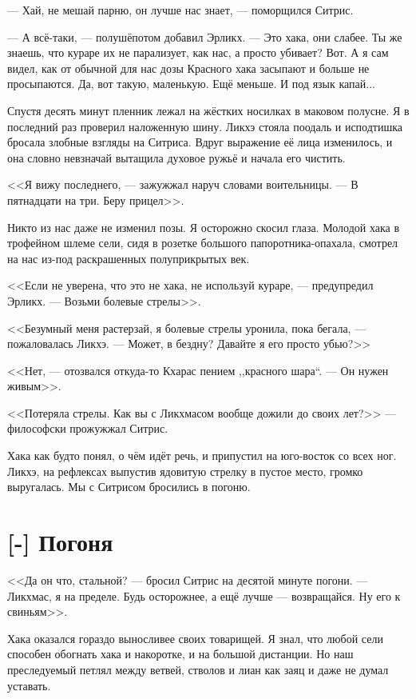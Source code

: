 --- Хай, не мешай парню, он лучше нас знает, --- поморщился Ситрис.

--- А всё-таки, --- полушёпотом добавил Эрликх.
--- Это хака, они слабее.
Ты же знаешь, что кураре их не парализует, как нас, а просто убивает?
Вот.
А я сам видел, как от обычной для нас дозы Красного хака засыпают и больше не просыпаются.
Да, вот такую, маленькую.
Ещё меньше.
И под язык капай...

Спустя десять минут пленник лежал на жёстких носилках в маковом полусне.
Я в последний раз проверил наложенную шину.
Ликхэ стояла поодаль и исподтишка бросала злобные взгляды на Ситриса.
Вдруг выражение её лица изменилось, и она словно невзначай вытащила духовое ружьё и начала его чистить.

<<Я вижу последнего, --- зажужжал наруч словами воительницы.
--- В пятнадцати на три.
Беру прицел>>.

Никто из нас даже не изменил позы.
Я осторожно скосил глаза.
Молодой хака в трофейном шлеме сели, сидя в розетке большого папоротника-опахала, смотрел на нас из-под раскрашенных полуприкрытых век.

<<Если не уверена, что это не хака, не используй кураре, --- предупредил Эрликх.
--- Возьми болевые стрелы>>.

<<Безумный меня растерзай, я болевые стрелы уронила, пока бегала, --- пожаловалась Ликхэ.
--- Может, в бездну?
Давайте я его просто убью?>>

<<Нет, --- отозвался откуда-то Кхарас пением ,,красного шара``.
--- Он нужен живым>>.

<<Потеряла стрелы.
Как вы с Ликхмасом вообще дожили до своих лет?>> --- философски прожужжал Ситрис.

Хака как будто понял, о чём идёт речь, и припустил на юго-восток со всех ног.
Ликхэ, на рефлексах выпустив ядовитую стрелку в пустое место, громко выругалась.
Мы с Ситрисом бросились в погоню.

\section{[-] Погоня}

<<Да он что, стальной? --- бросил Ситрис на десятой минуте погони.
--- Ликхмас, я на пределе.
Будь осторожнее, а ещё лучше --- возвращайся.
Ну его к свиньям>>.

Хака оказался гораздо выносливее своих товарищей.
Я знал, что любой сели способен обогнать хака и накоротке, и на большой дистанции.
Но наш преследуемый петлял между ветвей, стволов и лиан как заяц и даже не думал уставать.

